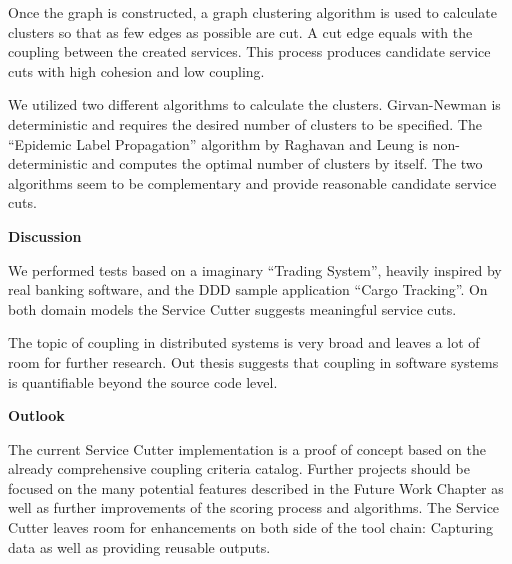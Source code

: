 Once the graph is constructed, a graph clustering algorithm is used to calculate clusters so that as few edges as possible are cut. A cut edge equals with the coupling between the created services. This process produces candidate service cuts with high cohesion and low coupling.

We utilized two different algorithms to calculate the clusters. Girvan-Newman is deterministic and requires the desired number of clusters to be specified. The \enquote{Epidemic Label Propagation} algorithm by Raghavan and Leung is non-deterministic and computes the optimal number of clusters by itself. The two algorithms seem to be complementary and provide reasonable candidate service cuts. 


\textbf{Discussion}

We performed tests based on a imaginary \enquote{Trading System}, heavily inspired by real banking software, and the DDD sample application \enquote{Cargo Tracking}. On both domain models the Service Cutter suggests meaningful service cuts.

The topic of coupling in distributed systems is very broad and leaves a lot of room for further research. Out thesis suggests that coupling in software systems is quantifiable beyond the source code level.

\textbf{Outlook}

The current Service Cutter implementation is a proof of concept based on the already comprehensive coupling criteria catalog. Further projects should be focused on the many potential features described in the Future Work Chapter as well as further improvements of the scoring process and algorithms. The Service Cutter leaves room for enhancements on both side of the tool chain: Capturing data as well as providing reusable outputs.
